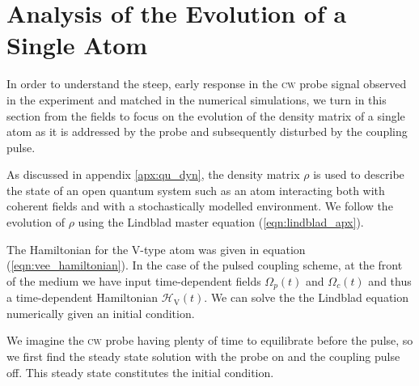 \section{Analysis of the Evolution of a Single Atom}
  \label{sec:simultons_analysis}

    In order to understand the steep, early response in the \textsc{cw} probe
    signal observed in the experiment and matched in the numerical simulations, we
    turn in this section from the fields to focus on the evolution of the density
    matrix of a single atom as it is addressed by the probe and subsequently
    disturbed by the coupling pulse.

    As discussed in appendix \ref{apx:qu_dyn}, the density matrix $\rho$ is used
    to describe the state of an open quantum system such as an atom interacting
    both with coherent fields and with a stochastically modelled environment. We
    follow the evolution of $\rho$ using the Lindblad master equation
    (\ref{eqn:lindblad_apx}).

    The Hamiltonian for the V-type atom was given in equation
    (\ref{eqn:vee_hamiltonian}). In the case of the pulsed coupling scheme, at the
    front of the medium we have input time-dependent fields $\Omega_p(t)$ and
    $\Omega_c(t)$ and thus a time-dependent Hamiltonian
    $\mathcal{H}_\mathrm{V}(t)$. We can solve the the Lindblad equation
    numerically given an initial condition.

    We imagine the \textsc{cw} probe having plenty of time to equilibrate before
    the pulse, so we first find the steady state solution with the probe on and
    the coupling pulse off. This steady state constitutes the initial condition.


